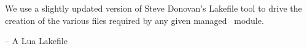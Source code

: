 
\startchapter[title=Lakefile]

We use a slightly updated version of Steve Donovan's Lakefile tool to 
drive the creation of the various files required by any given 
 managed \ConTeXt\ module. 

\startLakefile
-- A Lua Lakefile
\stopLakefile

\stopchapter